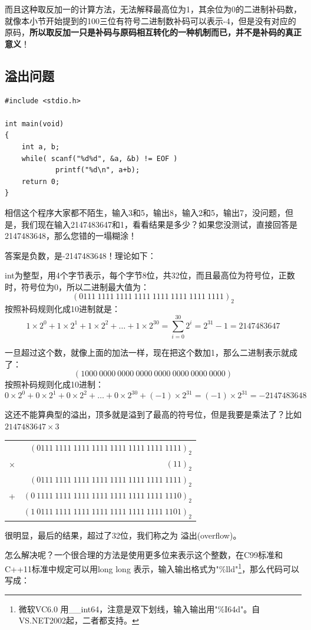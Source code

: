 \documentclass[11pt,twoside,a4paper,titlepage]{article}	%
\newcommand{\kw}[1]{\textcolor[rgb]{0.0,0.0,0.63}{ #1}}
\begin{document}
而且这种取反加一的计算方法，无法解释最高位为1，其余位为0的二进制补码数，就像本小节开始提到的100三位有符号二进制数补码可以表示-4，但是没有对应的原码，\textbf{所以取反加一只是补码与原码相互转化的一种机制而已，并不是补码的真正意义}！

\subsection{溢出问题}
\begin{lstlisting}
#include <stdio.h>

int main(void)
{
	int a, b;
	while( scanf("%d%d", &a, &b) != EOF )
			printf("%d\n", a+b);
	return 0;
}
\end{lstlisting}

相信这个程序大家都不陌生，输入3和5，输出8，输入2和5，输出7，没问题，但是，我们现在输入2147483647和1，看看结果是多少？如果您没测试，直接回答是2147483648，那么您错的一塌糊涂！

答案是负数，是-2147483648！理论如下：

int为整型，用4个字节表示，每个字节8位，共32位，而且最高位为符号位，正数时，符号位为0，所以二进制最大值为：
$$(0111\ 1111\ 1111\ 1111\ 1111\ 1111\ 1111\ 1111)_2$$
按照补码规则化成10进制就是：
$$1\times 2^0 + 1\times 2^1 + 1\times 2^2 +\dots +1\times 2^{30} = \sum^{30}_{i=0}2^{i} = 2^{31}-1 = 2147483647$$

一旦超过这个数，就像上面的加法一样，现在把这个数加1，那么二进制表示就成了：
$$(1000\ 0000\ 0000\ 0000\ 0000\ 0000\ 0000\ 0000)$$
按照补码规则化成10进制：
$$0\times 2^0 + 0\times 2^1 + 0\times 2^2 +\dots +0\times 2^{30} +(-1)\times 2^{31} = (-1)\times 2^{31} = -2147483648$$

这还不能算典型的溢出，顶多就是溢到了最高的符号位，但是我要是乘法了？比如$2147483647\times 3$

\begin{tabular}{cr}
 & $(0111\ 1111\ 1111\ 1111\ 1111\ 1111\ 1111\ 1111)_2$ \\
$\times $ & $(11)_2$ \\
\hline
 & $(0111\ 1111\ 1111\ 1111\ 1111\ 1111\ 1111\ 1111)_2$ \\
+ & $(0\ 1111\ 1111\ 1111\ 1111\ 1111\ 1111\ 1111\ 1110)_2$ \\
\hline
& $(1\ 0111\ 1111\ 1111\ 1111\ 1111\ 1111\ 1111\ 1101)_2$
\end{tabular}

很明显，最后的结果，超过了32位，我们称之为\kw{溢出(overflow)}。

怎么解决呢？一个很合理的方法是使用更多位来表示这个整数，在C99标准和C++11标准中规定可以用long long 表示，输入输出格式为"\%lld"\footnote{微软VC6.0 用\_\_int64，注意是双下划线，输入输出用"\%I64d"。自VS.NET2002起，二者都支持。}，那么代码可以写成：
\end{document}
